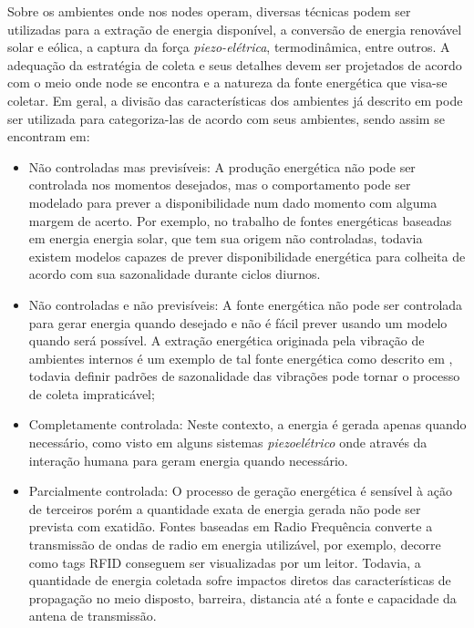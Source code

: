 Sobre os ambientes onde nos nodes operam, diversas técnicas podem ser utilizadas para a extração de energia disponível, a conversão de energia renovável solar e eólica, a captura da força \textit{piezo-elétrica}, termodinâmica, entre outros. A adequação da estratégia de coleta e seus detalhes devem ser projetados de acordo com o meio onde node se encontra e a natureza da fonte energética que visa-se coletar. Em geral, a divisão das características dos ambientes já descrito em \cite{shaikh_energy_2016} pode ser utilizada para categoriza-las de acordo com seus ambientes, sendo assim se encontram em:

\begin{itemize}

    \item Não controladas mas previsíveis: A produção energética não pode ser controlada nos momentos desejados, mas o comportamento pode ser modelado para prever a disponibilidade num dado momento com alguma margem de acerto. Por exemplo, no trabalho de  \cite{lee_energy_2018} fontes energéticas baseadas em energia energia solar, que tem sua origem não controladas, todavia existem modelos capazes de prever  disponibilidade energética para colheita de acordo com sua sazonalidade durante ciclos diurnos.
    
    \item Não controladas e não previsíveis: A fonte energética não pode ser controlada para gerar energia quando desejado e não é fácil prever usando um modelo quando será possível. A extração energética originada pela vibração de ambientes internos é um exemplo de tal fonte energética como descrito em \cite{wei_comprehensive_2017}, todavia definir padrões de sazonalidade das vibrações pode tornar o processo de coleta impraticável;
    
    \item Completamente controlada: Neste contexto, a energia é gerada apenas quando necessário, como visto em alguns sistemas \textit{piezoelétrico} onde através da interação humana para geram energia quando necessário.
    
    \item Parcialmente controlada: O processo de geração energética é sensível à ação de terceiros porém a quantidade exata de energia gerada não pode ser prevista com exatidão. Fontes baseadas em Radio Frequência converte a transmissão de ondas de radio em energia utilizável, por exemplo, \cite{shaikh_energy_2016} decorre como tags \acf{RFID} conseguem ser visualizadas por um leitor. Todavia, a quantidade de energia coletada sofre impactos diretos das características de propagação no meio disposto, barreira, distancia até a fonte e capacidade da antena de transmissão.
\end{itemize}

